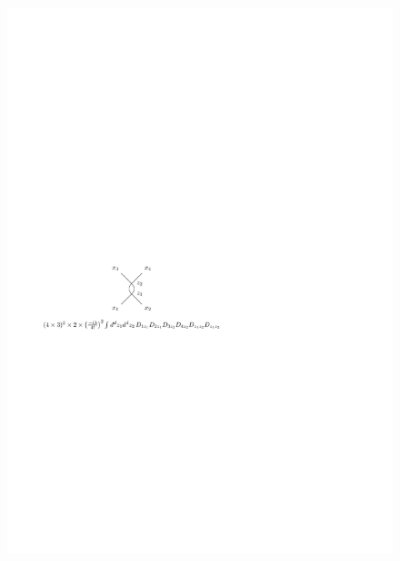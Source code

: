 \begin{itemize}
	\begin{figure}[H]
		\centering
		\includegraphics[scale=1]{figures/collision between particles - another Feynman diagram.pdf}
	\end{figure}
\end{itemize}

